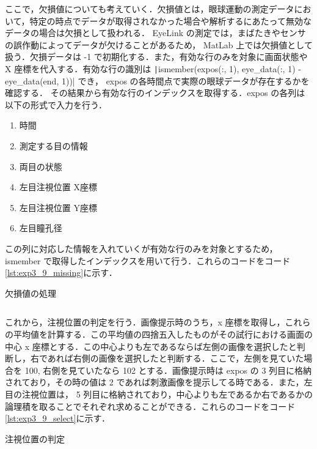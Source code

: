 \documentclass[dvipdfmx, titlepage, t]{jsarticle}
\begin{document}
    ここで，欠損値についても考えていく．欠損値とは，眼球運動の測定データにおいて，特定の時点でデータが取得されなかった場合や解析するにあたって無効なデータの場合は欠損として扱われる． EyeLink の測定では，まばたきやセンサの誤作動によってデータが欠けることがあるため， MatLab 上では欠損値として扱う．欠損データは -1 で初期化する．また，有効な行のみを対象に画面状態や X 座標を代入する．有効な行の識別は \texttt|ismember(expos(:, 1), eye_data(:, 1) - eye_data(end, 1))| でき， expos の各時間点で実際の眼球データが存在するかを確認する．
    その結果から有効な行のインデックスを取得する．expos の各列は以下の形式で入力を行う．
    \begin{enumerate}[label=\arabic*列目]
        \item 時間
        \item 測定する目の情報
        \item 両目の状態
        \item 左目注視位置 X座標
        \item 左目注視位置 Y座標
        \item 左目瞳孔径
    \end{enumerate}
    この列に対応した情報を入れていくが有効な行のみを対象とするため， ismember で取得したインデックスを用いて行う．これらのコードをコード\ref{lst:exp3_9_missing}に示す．

    \begin{program}[H]
        \caption{欠損値の処理}
        \inputminted[linenos,
        firstline=29,
        lastline=48,
        frame=lines,
        fontsize = \small]{matlab}{code/Exp3_9_Matlab.m}
        \label{lst:exp3_9_missing}
    \end{program}

    これから，注視位置の判定を行う．画像提示時のうち，x 座標を取得し，これらの平均値を計算する．この平均値の四捨五入したものがその試行における画面の中心 x 座標とする．この中心よりも左であるならば左側の画像を選択したと判断し，右であれば右側の画像を選択したと判断する．ここで，左側を見ていた場合を 100, 右側を見ていたなら 102 とする．画像提示時は expos の 3 列目に格納されており，その時の値は 2 であれば刺激画像を提示してる時である．また，左目の注視位置は， 5 列目に格納されており，中心よりも左であるか右であるかの論理積を取ることでそれぞれ求めることができる．これらのコードをコード\ref{lst:exp3_9_select}に示す．
    \begin{program}[H]
        \caption{注視位置の判定}
        \inputminted[linenos,
        firstline=50,
        lastline=58,
        frame=lines,
        fontsize = \small]{matlab}{code/Exp3_9_Matlab.m}
        \label{lst:exp3_9_select}
    \end{program}
\end{document}
